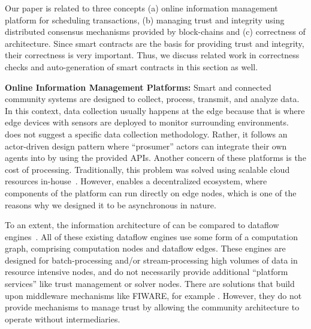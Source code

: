 
\ifExtended
Our paper is related to three concepts (a) online information management platform for scheduling transactions, (b) managing trust and integrity using distributed consensus mechanisms provided by block-chains and (c) correctness of architecture. 
Since smart contracts are the basis for providing trust and integrity, their correctness is very important. Thus, we discuss related work in correctness checks and auto-generation of smart contracts in this section as well.
\fi

\textbf{Online Information Management Platforms:}
Smart and connected community systems are designed to collect, process, transmit, and analyze data. In this context, data collection usually happens at the edge because that is where edge devices with sensors are deployed to monitor surrounding environments. \Platform does not suggest a specific data collection methodology. Rather, it follows an actor-driven design pattern where ``prosumer'' actors can integrate their own agents into \Platform by using the provided APIs.  Another concern of these platforms is the cost of processing. Traditionally, this problem was solved using scalable cloud resources in-house~\cite{schmidt2014elastic}. However, \Platform enables a decentralized ecosystem, where components of the platform can run directly on edge nodes, which is one of the reasons why we designed it to be asynchronous in nature.

To an extent, the information architecture of \Platform can be compared to  dataflow engines~\cite{Storm, Spark, neumeyer2010s4}. All of these existing dataflow engines use some form of a computation graph, comprising computation nodes and dataflow edges. These engines are designed for batch-processing and/or stream-processing high volumes of data in resource intensive nodes, and do not necessarily provide additional ``platform services'' like trust management or solver nodes. 
\ifExtended
There are solutions that build upon middleware mechanisms like FIWARE, for example \cite{lopez2017software}. However, they do not provide mechanisms to manage trust by allowing the community architecture to operate without intermediaries. 
\fi

